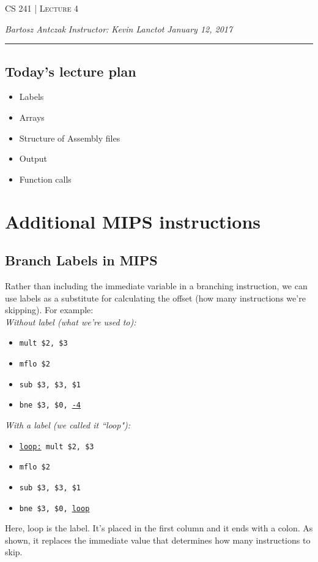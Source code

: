 \documentclass{report}
\newcommand{\lectureNum}{4}
\newcommand{\curDate}{January 12, 2017}
\newcommand{\course}{CS 241}
\newcommand{\instructor}{Kevin Lanctot}
\begin{document}
\begin{center}
\begin{Large}
\textsc{\course{} | Lecture \lectureNum{}}
\end{Large}
\end{center} 
\noindent \textit{Bartosz Antczak} \hfill
\textit{Instructor: \instructor{}} \hfill
\textit{\curDate{}}
\rule{\textwidth}{0.4pt}
\subsection{Today's lecture plan}
\begin{itemize}
\item Labels
\item Arrays
\item Structure of Assembly files
\item Output
\item Function calls
\end{itemize} 
\section{Additional MIPS instructions}
\subsection{Branch Labels in MIPS}
Rather than including the immediate variable in a branching instruction, we can use labels as a substitute for calculating the offset (how many instructions we're skipping). For example:\\
\textit{Without label (what we're used to):}
\begin{itemize}
\item[\textbf{0.}] \texttt{mult \$2, \$3}
\item[\textbf{4.}] \texttt{mflo \$2}
\item[\textbf{8.}] \texttt{sub \$3, \$3, \$1}
\item[\textbf{12.}] \texttt{bne \$3, \$0, \underline{-4}}
\end{itemize}
\textit{With a label (we called it ``loop"):}
\begin{itemize}
\item[\textbf{0.}] \texttt{\underline{loop:} mult \$2, \$3}
\item[\textbf{4.}] \texttt{mflo \$2}
\item[\textbf{8.}] \texttt{sub \$3, \$3, \$1}
\item[\textbf{12.}] \texttt{bne \$3, \$0, \underline{loop}}
\end{itemize}
Here, loop is the label. It's placed in the first column and it ends with a colon. As shown, it replaces the immediate value that determines how many instructions to skip.
\end{document}
